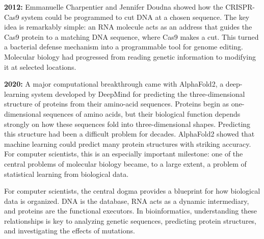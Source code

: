 \medskip\noindent\textbf{2012:} Emmanuelle Charpentier and Jennifer Doudna showed how the CRISPR-Cas9 system could be programmed to cut DNA at a chosen sequence. The key idea is remarkably simple: an RNA molecule acts as an address that guides the Cas9 protein to a matching DNA sequence, where Cas9 makes a cut. This turned a bacterial defense mechanism into a programmable tool for genome editing. Molecular biology had progressed from reading genetic information to modifying it at selected locations.

\medskip\noindent\textbf{2020:} A major computational breakthrough came with AlphaFold2, 
%
%
a deep-learning system developed by DeepMind for predicting the three-dimensional structure of proteins from their amino-acid sequences. Proteins begin as one-dimensional sequences of amino acids, but their biological function depends strongly on how these sequences fold into three-dimensional shapes. Predicting this structure had been a difficult problem for decades. AlphaFold2 showed that machine learning could predict many protein structures with striking accuracy. For computer scientists, this is an especially important milestone: one of the central problems of molecular biology became, to a large extent, a problem of statistical learning from biological data.

\bigskip\noindent
For computer scientists, the central dogma provides a blueprint for how biological data is organized. DNA is the database, RNA acts as a dynamic intermediary, and proteins are the functional executors. In bioinformatics, understanding these relationships is key to analyzing genetic sequences, predicting protein structures, and investigating the effects of mutations.
